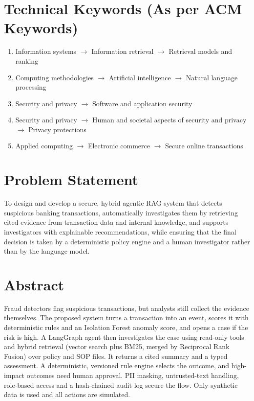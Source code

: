 \documentclass[oneside,a4paper,12pt]{report}
\begin{document}
\section{Technical Keywords (As per ACM Keywords)}
\begin{enumerate}[label=\arabic*.]
  \item Information systems $\rightarrow$ Information retrieval $\rightarrow$ Retrieval models and ranking
  \item Computing methodologies $\rightarrow$ Artificial intelligence $\rightarrow$ Natural language processing
  \item Security and privacy $\rightarrow$ Software and application security
  \item Security and privacy $\rightarrow$ Human and societal aspects of security and privacy $\rightarrow$ Privacy protections
  \item Applied computing $\rightarrow$ Electronic commerce $\rightarrow$ Secure online transactions
\end{enumerate}

\section{Problem Statement}
\label{sec:problem}
To design and develop a secure, hybrid agentic RAG system that detects suspicious banking transactions, automatically investigates them by retrieving cited evidence from transaction data and internal knowledge, and supports investigators with explainable recommendations, while ensuring that the final decision is taken by a deterministic policy engine and a human investigator rather than by the language model.

\section{Abstract}
Fraud detectors flag suspicious transactions, but analysts still collect the evidence themselves. The proposed system turns a transaction into an event, scores it with deterministic rules and an Isolation Forest anomaly score, and opens a case if the risk is high. A LangGraph agent then investigates the case using read-only tools and hybrid retrieval (vector search plus BM25, merged by Reciprocal Rank Fusion) over policy and SOP files. It returns a cited summary and a typed assessment. A deterministic, versioned rule engine selects the outcome, and high-impact outcomes need human approval. PII masking, untrusted-text handling, role-based access and a hash-chained audit log secure the flow. Only synthetic data is used and all actions are simulated.
\end{document}

